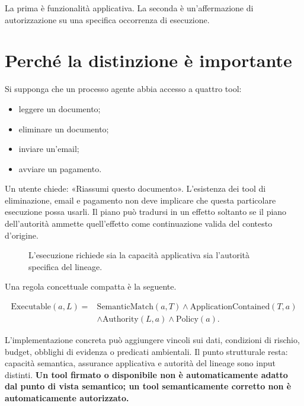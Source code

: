 \documentclass[10pt,oneside,openany]{book}
\begin{document}
La prima è funzionalità applicativa. La seconda è un'affermazione di autorizzazione su una specifica occorrenza di esecuzione.

\section{Perché la distinzione è importante}
Si supponga che un processo agente abbia accesso a quattro tool:

\begin{itemize}
\item leggere un documento;
\item eliminare un documento;
\item inviare un'email;
\item avviare un pagamento.
\end{itemize}

Un utente chiede: «Riassumi questo documento». L'esistenza dei tool di eliminazione, email e pagamento non deve implicare che questa particolare esecuzione possa usarli. Il piano può tradursi in un effetto soltanto se il piano dell'autorità ammette quell'effetto come continuazione valida del contesto d'origine.

\begin{figure}[ht]
\centering
{}
\caption{L'esecuzione richiede sia la capacità applicativa sia l'autorità specifica del lineage.}
\end{figure}

Una regola concettuale compatta è la seguente.
\begin{formulabox}
\[
\begin{aligned}
\mathrm{Executable}(a,L)={}&\mathrm{SemanticMatch}(a,T)
\land \mathrm{ApplicationContained}(T,a)\\
&\land \mathrm{Authority}(L,a)
\land \mathrm{Policy}(a).
\end{aligned}
\]
\end{formulabox}
L'implementazione concreta può aggiungere vincoli sui dati, condizioni di rischio, budget, obblighi di evidenza o predicati ambientali. Il punto strutturale resta: capacità semantica, assurance applicativa e autorità del lineage sono input distinti. \textbf{Un tool firmato o disponibile non è automaticamente adatto dal punto di vista semantico; un tool semanticamente corretto non è automaticamente autorizzato.}
\end{document}
